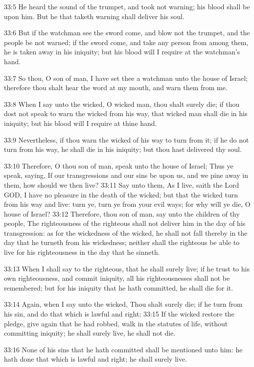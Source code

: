33:5 He heard the sound of the trumpet, and took not warning; his blood shall be upon him. But he that taketh warning shall deliver his soul.

33:6 But if the watchman see the sword come, and blow not the trumpet, and the people be not warned; if the sword come, and take any person from among them, he is taken away in his iniquity; but his blood will I require at the watchman's hand.

33:7 So thou, O son of man, I have set thee a watchman unto the house of Israel; therefore thou shalt hear the word at my mouth, and warn them from me.

33:8 When I say unto the wicked, O wicked man, thou shalt surely die; if thou dost not speak to warn the wicked from his way, that wicked man shall die in his iniquity; but his blood will I require at thine hand.

33:9 Nevertheless, if thou warn the wicked of his way to turn from it; if he do not turn from his way, he shall die in his iniquity; but thou hast delivered thy soul.

33:10 Therefore, O thou son of man, speak unto the house of Israel; Thus ye speak, saying, If our transgressions and our sins be upon us, and we pine away in them, how should we then live?  33:11 Say unto them, As I live, saith the Lord GOD, I have no pleasure in the death of the wicked; but that the wicked turn from his way and live: turn ye, turn ye from your evil ways; for why will ye die, O house of Israel?  33:12 Therefore, thou son of man, say unto the children of thy people, The righteousness of the righteous shall not deliver him in the day of his transgression: as for the wickedness of the wicked, he shall not fall thereby in the day that he turneth from his wickedness; neither shall the righteous be able to live for his righteousness in the day that he sinneth.

33:13 When I shall say to the righteous, that he shall surely live; if he trust to his own righteousness, and commit iniquity, all his righteousnesses shall not be remembered; but for his iniquity that he hath committed, he shall die for it.

33:14 Again, when I say unto the wicked, Thou shalt surely die; if he turn from his sin, and do that which is lawful and right; 33:15 If the wicked restore the pledge, give again that he had robbed, walk in the statutes of life, without committing iniquity; he shall surely live, he shall not die.

33:16 None of his sins that he hath committed shall be mentioned unto him: he hath done that which is lawful and right; he shall surely live.

